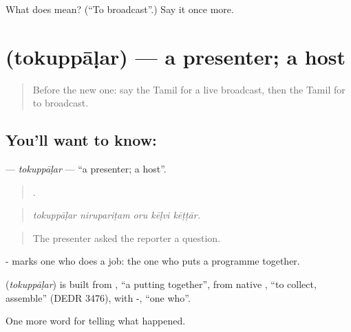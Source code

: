 \begin{tcolorbox}[breakable,colback=teal!4,colframe=teal!35!black,title={Before you move on}]
What does  mean? (\textquotedblleft{}To broadcast\textquotedblright{}.) Say it once more.
\end{tcolorbox}
\section[\texorpdfstring{\ta{தொகுப்பாளர்} (tokuppāḷar)}{தொகுப்பாளர் (tokuppāḷar)}]{ (tokuppāḷar) — a presenter; a host}

\label{lesson:TA-C305-tokuppalar}



\begin{quote}
Before the new one: say the Tamil for a live broadcast, then the Tamil for to broadcast.
\end{quote}

\subsection*{You'll want to know: }
\textbf{} — \emph{tokuppāḷar} — \textquotedblleft{}a presenter; a host\textquotedblright{}.

\begin{quote}
    .
\end{quote}

\begin{quote}
\emph{tokuppāḷar nirupariṭam oru kēḷvi kēṭṭār.}
\end{quote}

\begin{quote}
The presenter asked the reporter a question.
\end{quote}

- marks one who does a job: the one who puts a programme together.

\begin{cousinweb}
\textbf{} (\emph{tokuppāḷar}) is built from , \textquotedblleft{}a putting together\textquotedblright{}, from native , \textquotedblleft{}to collect, assemble\textquotedblright{} (DEDR 3476), with -, \textquotedblleft{}one who\textquotedblright{}.
\end{cousinweb}

\begin{grammarlens}[title={What you've built}]
One more word for telling what happened.
\end{grammarlens}

